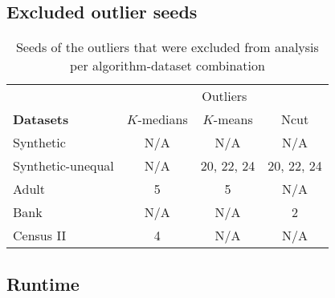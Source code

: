 \subsection*{Excluded outlier seeds}

\begin{table}[H]
	\centering
	\begin{tabular}{|l|c|c|c|}
		\hline
		& \multicolumn{3}{c|}{Outliers} \\
		\cline{2-4}
		\textbf{Datasets} & $K$-medians & $K$-means & Ncut \\ 
		\cline{2-4}
		\hline
		Synthetic & N/A & N/A & N/A \\
		Synthetic-unequal & N/A & 20, 22, 24 & 20, 22, 24 \\
		Adult & 5 & 5 & N/A \\
		Bank & N/A & N/A & 2 \\
		Census II & 4 & N/A & N/A \\
		\hline
	\end{tabular}
	\caption{Seeds of the outliers that were excluded from analysis per algorithm-dataset combination}
	\label{tab:outliers}
\end{table}

\subsection*{Runtime}

